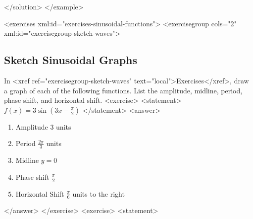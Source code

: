       </solution>
    </example>

  <exercises xml:id="exercises-sinusoidal-functions">
    <exercisegroup cols="2" xml:id="exercisegroup-sketch-waves">

      \subsection*{Sketch Sinusoidal Graphs}
          In <xref ref="exercisegroup-sketch-waves" text="local">Exercises</xref>, draw a graph of each of the following functions. List the amplitude, midline, period, phase shift, and horizontal shift.
      <exercise>
        <statement>
            $f(x)=3\sin \left( 3x-\frac{\pi}{2} \right)$
        </statement>
        <answer>
            \begin{enumerate}
              \item Amplitude $3$ units
              \item Period $\frac{2\pi}{3}$ units
              \item Midline $y=0$
              \item Phase shift $\frac{\pi}{2}$
              \item Horizontal Shift $\frac{\pi}{6}$ units to the right
            \end{enumerate}
          
            
            
        </answer>
      </exercise>
      <exercise>
        <statement>
          
